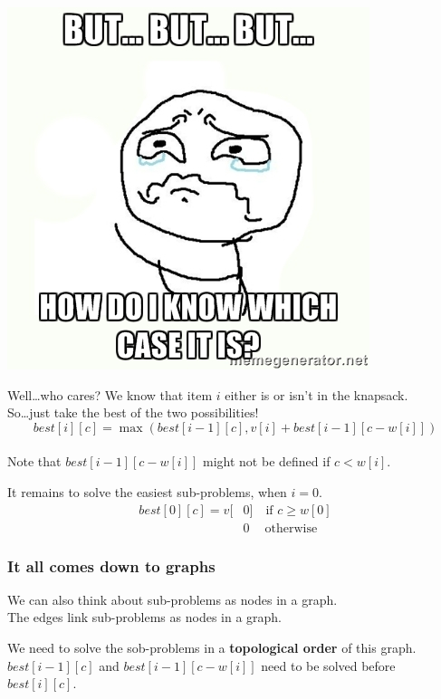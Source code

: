 \documentclass[12pt]{beamer}
\newcommand{\blank}{\vspace{.5cm}}
\begin{document}
\begin{frame}
    \begin{center}
        \includegraphics[scale=.4]{img/but.jpg}
    \end{center} \pause
    Well\ldots who cares? We know that item $i$ either is or isn't in the knapsack. \\\blank
    So\ldots just take the best of the two possibilities!
    \[
        best[i][c] = \max \left( best[i-1][c], v[i] + best[i-1][c-w[i]] \right)
    \]
    \\\blank
    Note that $best[i-1][c-w[i]]$ might not be defined if $c < w[i]$.
\end{frame}

\begin{frame}
    It remains to solve the easiest sub-problems, when $i=0$. \pause \\\blank
    \begin{align*}
        best[0][c] = v[&0] \quad \text{if $c \geq w[0]$} \\
        &0 \ \quad \text{otherwise}
    \end{align*}
\end{frame}

\begin{frame}
    \frametitle{It all comes down to graphs}
    We can also think about sub-problems as nodes in a graph. \\\blank
    The edges link sub-problems as nodes in a graph. \\\blank
    \begin{center}
    \end{center}
    \blank
    We need to solve the sob-problems in a \textbf{topological order} of this graph. \\\blank
    $best[i-1][c]$ and $best[i-1][c-w[i]]$ need to be solved before $best[i][c]$.
\end{frame}
\end{document}
